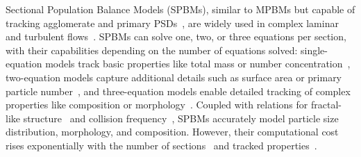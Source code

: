 Sectional Population Balance Models (SPBMs), similar to MPBMs but capable of tracking agglomerate and primary PSDs~\citep{Xiong1993}, are widely used in complex laminar~\citep{kholghy2016core} and turbulent flows~\citep{schiener2019transported}. SPBMs can solve one, two, or three equations per section, with their capabilities depending on the number of equations solved: single-equation models track basic properties like total mass or number concentration~\citep{gelbard1980sectional}, two-equation models capture additional details such as surface area or primary particle number~\citep{park2004novel}, and three-equation models enable detailed tracking of complex properties like composition or morphology~\citep{kholghy2016core}. Coupled with relations for fractal-like structure~\citep{matsoukas1991dynamics} and collision frequency~\citep{fuchs1964mechanics}, SPBMs accurately model particle size distribution, morphology, and composition. However, their computational cost rises exponentially with the number of sections~\citep{xiong1993formation} and tracked properties~\citep{kholghy2016core}.
